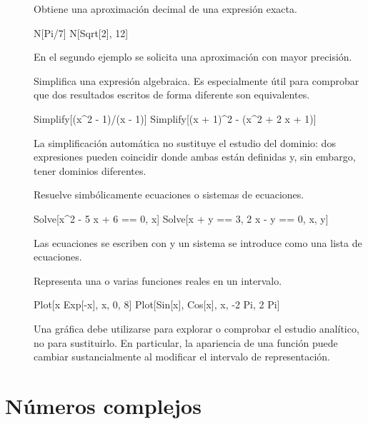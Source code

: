 \begin{description}

\item[] Obtiene una aproximación decimal de una expresión exacta.
\begin{mathematicacode}
N[Pi/7]
N[Sqrt[2], 12]
\end{mathematicacode}
En el segundo ejemplo se solicita una aproximación con mayor precisión.

\item[] Simplifica una expresión algebraica. Es especialmente útil para comprobar que dos resultados escritos de forma diferente son equivalentes.
\begin{mathematicacode}
Simplify[(x^2 - 1)/(x - 1)]
Simplify[(x + 1)^2 - (x^2 + 2 x + 1)]
\end{mathematicacode}
La simplificación automática no sustituye el estudio del dominio: dos expresiones pueden coincidir donde ambas están definidas y, sin embargo, tener dominios diferentes.

\item[] Resuelve simbólicamente ecuaciones o sistemas de ecuaciones.
\begin{mathematicacode}
Solve[x^2 - 5 x + 6 == 0, x]
Solve[{x + y == 3, 2 x - y == 0}, {x, y}]
\end{mathematicacode}
Las ecuaciones se escriben con \MatCmd{==} y un sistema se introduce como una lista de ecuaciones.

\item[] Representa una o varias funciones reales en un intervalo.
\begin{mathematicacode}
Plot[x Exp[-x], {x, 0, 8}]
Plot[{Sin[x], Cos[x]}, {x, -2 Pi, 2 Pi}]
\end{mathematicacode}
Una gráfica debe utilizarse para explorar o comprobar el estudio analítico, no para sustituirlo. En particular, la apariencia de una función puede cambiar sustancialmente al modificar el intervalo de representación.

\end{description}

\section*{Números complejos}

